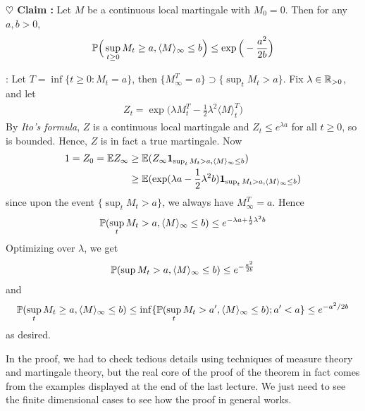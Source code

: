 \documentclass[12pt,a4paper]{article}
\newenvironment{proof}
{\begin{changemargin}{0.5cm}{0.5cm} 
	}%
	{\end{changemargin}
}
\newenvironment{subproof}
{\begin{changemargin}{0.5cm}{0.5cm} 
	}%
	{\end{changemargin}
}
\newenvironment{p}
{\begin{proof} 
	}%
	{\end{proof}
}
\begin{document}
\begin{p}
\textbf{$\heartsuit$ Claim :} Let $M$ be a continuous local martingale with $M_0 =0$. Then for any $a,b>0$,
\begin{align*}
\mathbb{P}\Big( \sup_{t\geq 0} M_t \geq a, \langle M\rangle_{\infty} \leq b\Big) \leq \exp \Big( -\frac{a^2}{2b} \Big)
\end{align*}
\begin{subproof}
: Let $T=\inf \{t\geq 0 : M_t =a \}$, then $\{M_{\infty}^{T} =a \} \supset \{ \sup_t M_t >a\}$. Fix $\lambda \in \mathbb{R}_{>0}$, and let
\begin{align*}
Z_t = \exp \Big( \lambda M_t^T -\frac{1}{2} \lambda^2 \langle M \rangle_t^T \Big)
\end{align*}
By \emph{Ito's formula}, $Z$ is a continuous local martingale and $Z_t \leq e^{\lambda a}$ for all $t\geq 0$, so is bounded. Hence, $Z$ is in fact a true martingale. Now
\begin{align*}
1 = Z_0 = \mathbb{E} Z_{\infty} &\geq \mathbb{E}(Z_{\infty} \bm{1}_{\sup_{t} M_t >a, \langle M \rangle_{\infty} \leq b}) \\
&\geq \mathbb{E} (\exp (\lambda a -\frac{1}{2} \lambda^2 b) \bm{1}_{\sup_{t} M_t >a, \langle M \rangle_{\infty} \leq b})
\end{align*}
since upon the event $\{\sup_{t} M_t >a\}$, we always have $M_{\infty}^T =a$. Hence
\begin{align*}
\mathbb{P} (\sup_t M_t >a, \langle M \rangle_{\infty} \leq b) \leq e^{-\lambda a + \frac{1}{2} \lambda^2 b}
\end{align*} 
Optimizing over $\lambda$, we get
\begin{align*}
\mathbb{P} (\sup M_t >a, \langle M \rangle_{\infty} \leq b) \leq e^{-\frac{a^2}{2b}}
\end{align*}
and
\begin{align*}
\mathbb{P}(\sup_t M_t \geq a, \langle M \rangle_{\infty} \leq b) \leq \inf \{ \mathbb{P}(\sup_t M_t >a', \langle M\rangle_{\infty} \leq b) ; a'<a \} \leq e^{-a^2 /2b}
\end{align*}
as desired.
\end{subproof}
\eop 
\end{p}
\s

In the proof, we had to check tedious details using techniques of measure theory and martingale theory, but the real core of the proof of the theorem in fact comes from the examples displayed at the end of the last lecture. We just need to see the finite dimensional cases to see how the proof in general works. 
\s

\newday
\end{document}
